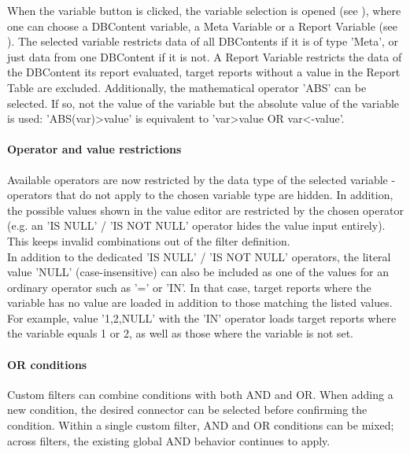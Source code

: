 When the variable button is clicked, the variable selection is opened (see ), where one can choose a DBContent variable, a Meta Variable or a Report Variable (see ). The selected variable restricts data of all DBContents if it is of type 'Meta', or just data from one DBContent if it is not. A Report Variable restricts the data of the DBContent its report evaluated, target reports without a value in the Report Table are excluded. Additionally, the mathematical operator 'ABS' can be selected. If so, not the value of the variable but the absolute value of the variable is used: 'ABS(var)>value' is equivalent to 'var>value OR var<-value'. \\

\paragraph{Operator and value restrictions}

Available operators are now restricted by the data type of the selected variable - operators that do not apply to the chosen variable type are hidden. In addition, the possible values shown in the value editor are restricted by the chosen operator (e.g. an 'IS NULL' / 'IS NOT NULL' operator hides the value input entirely). This keeps invalid combinations out of the filter definition. \\

In addition to the dedicated 'IS NULL' / 'IS NOT NULL' operators, the literal value 'NULL' (case-insensitive) can also be included as one of the values for an ordinary operator such as '=' or 'IN'. In that case, target reports where the variable has no value are loaded in addition to those matching the listed values. For example, value '1,2,NULL' with the 'IN' operator loads target reports where the variable equals 1 or 2, as well as those where the variable is not set. \\

\paragraph{OR conditions}

Custom filters can combine conditions with both AND and OR. When adding a new condition, the desired connector can be selected before confirming the condition. Within a single custom filter, AND and OR conditions can be mixed; across filters, the existing global AND behavior continues to apply. \\

